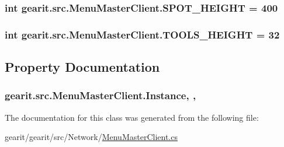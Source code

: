 \hypertarget{classgearit_1_1src_1_1_menu_master_client_a3acfff33abfd33346198d950af0511ae}{
\subsubsection[{S\+P\+O\+T\+\_\+\+H\+E\+I\+G\+H\+T}]{\setlength{\rightskip}{0pt plus 5cm}int gearit.\+src.\+Menu\+Master\+Client.\+S\+P\+O\+T\+\_\+\+H\+E\+I\+G\+H\+T = 400\hspace{0.3cm}{\ttfamily [static]}}}\label{classgearit_1_1src_1_1_menu_master_client_a3acfff33abfd33346198d950af0511ae}
\hypertarget{classgearit_1_1src_1_1_menu_master_client_a09b6a42eb239c54a1dd0460798a436bf}{
\subsubsection[{T\+O\+O\+L\+S\+\_\+\+H\+E\+I\+G\+H\+T}]{\setlength{\rightskip}{0pt plus 5cm}int gearit.\+src.\+Menu\+Master\+Client.\+T\+O\+O\+L\+S\+\_\+\+H\+E\+I\+G\+H\+T = 32\hspace{0.3cm}{\ttfamily [static]}}}\label{classgearit_1_1src_1_1_menu_master_client_a09b6a42eb239c54a1dd0460798a436bf}


\subsection{Property Documentation}
\hypertarget{classgearit_1_1src_1_1_menu_master_client_a95cbf45df8084be23cafb1ab1ddf1a2a}{
\subsubsection[{Instance}]{ gearit.\+src.\+Menu\+Master\+Client.\+Instance\hspace{0.3cm}{\ttfamily [static]}, {\ttfamily [get]}, {\ttfamily [set]}}}\label{classgearit_1_1src_1_1_menu_master_client_a95cbf45df8084be23cafb1ab1ddf1a2a}


The documentation for this class was generated from the following file\+:\begin{DoxyCompactItemize}
\item 
gearit/gearit/src/\+Network/\hyperlink{_menu_master_client_8cs}{Menu\+Master\+Client.\+cs}\end{DoxyCompactItemize}
